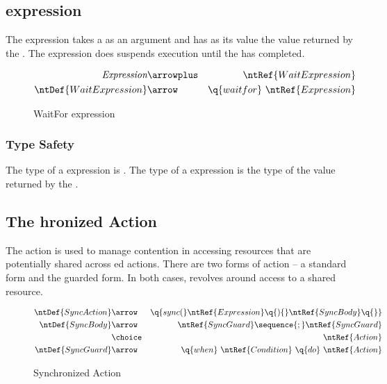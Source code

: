 \subsection{ expression}
\label{waitExpression}
The  expression takes a  as an argument and has as its value the value returned by the . The  expression does suspends execution until the  has completed.

\begin{figure}[htbp]
\begin{eqnarray*}
\emph{Expression}&\arrowplus&\ntRef{WaitExpression}\\
\ntDef{WaitExpression}&\arrow&\q{waitfor}\ \ntRef{Expression}
\end{eqnarray*}
\caption{WaitFor expression}\label{waitforExpressionSyntaxFig}
\end{figure}

\subsubsection{Type Safety}
The type of a  expression is . The type of a  expression is the type of the value returned by the .

\begin{prooftree}
\end{prooftree}

\subsection{The hronized Action}
\label{syncAction}

The  action is used to manage contention in accessing resources that are potentially shared across ed actions. There are two forms of  action -- a standard form and the guarded form. In both cases,  revolves around access to a shared resource.

\begin{figure}[htbp]
\begin{eqnarray*}
\ntDef{SyncAction}&\arrow&\q{sync(}\ntRef{Expression}\q{)\{}\ntRef{SyncBody}\q{\}}\\
\ntDef{SyncBody}&\arrow&\ntRef{SyncGuard}\sequence{;}\ntRef{SyncGuard}\\
&\choice&\ntRef{Action}\\
\ntDef{SyncGuard}&\arrow&\q{when}\ \ntRef{Condition}\ \q{do}\ \ntRef{Action}
\end{eqnarray*}
\caption{Synchronized Action}\label{syncActionSyntaxFig}
\end{figure}

